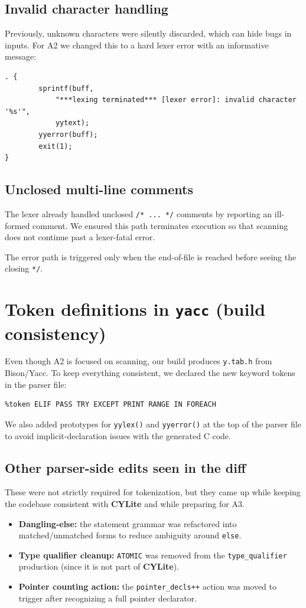 \documentclass[11pt]{article}
\newcommand{\lang}{\textbf{CYLite}}
\begin{document}
\subsection{Invalid character handling}
Previously, unknown characters were silently discarded, which can hide bugs in inputs.
For A2 we changed this to a hard lexer error with an informative message:
\begin{lstlisting}
. {
		sprintf(buff,
			"***lexing terminated*** [lexer error]: invalid character '%s'",
			yytext);
		yyerror(buff);
		exit(1);
}
\end{lstlisting}

\subsection{Unclosed multi-line comments}
The lexer already handled unclosed \texttt{/* ... */} comments by reporting an ill-formed comment.
We ensured this path terminates execution so that scanning does not continue past a lexer-fatal error.

The error path is triggered only when the end-of-file is reached before seeing the closing \texttt{*/}.

\section{Token definitions in \texttt{yacc} (build consistency)}
Even though A2 is focused on scanning, our build produces \texttt{y.tab.h} from Bison/Yacc.
To keep everything consistent, we declared the new keyword tokens in the parser file:
\begin{lstlisting}
%token ELIF PASS TRY EXCEPT PRINT RANGE IN FOREACH
\end{lstlisting}

We also added prototypes for \texttt{yylex()} and \texttt{yyerror()} at the top of the parser file to avoid implicit-declaration issues with the generated C code.

\subsection*{Other parser-side edits seen in the diff}
These were not strictly required for tokenization, but they came up while keeping the codebase consistent with \lang{} and while preparing for A3.
\begin{itemize}
	\item \textbf{Dangling-else:} the statement grammar was refactored into matched/unmatched forms to reduce ambiguity around \texttt{else}.
	\item \textbf{Type qualifier cleanup:} \texttt{ATOMIC} was removed from the \texttt{type\_qualifier} production (since it is not part of \lang{}).
	\item \textbf{Pointer counting action:} the \texttt{pointer\_decls++} action was moved to trigger after recognizing a full pointer declarator.
\end{itemize}
\end{document}
